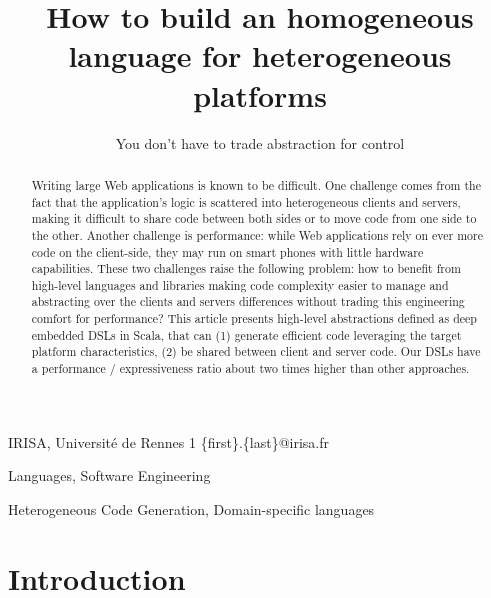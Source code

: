 \documentclass[preprint]{sigplanconf}
\begin{document}
\copyrightdata{[to be supplied]} 


\title{How to build an homogeneous language for heterogeneous platforms}
\subtitle{You don’t have to trade abstraction for control}

           {IRISA, Université de Rennes 1}
           {\{first\}.\{last\}@irisa.fr}

\maketitle

\begin{abstract}
Writing large Web applications is known to be difficult. One challenge comes from the fact that the application's
logic is scattered into heterogeneous clients and servers, making it difficult to share code between both sides or to
move code from one side to the other. Another challenge is performance: while Web applications rely on ever more
code on the client-side, they may run on smart phones with little hardware capabilities. These two challenges raise
the following problem: how to benefit from high-level languages and libraries making code complexity easier to manage
and abstracting over the clients and servers differences without trading this engineering comfort for performance?
This article presents high-level abstractions defined as deep embedded DSLs in Scala, that can (1) generate efficient
code leveraging the target platform characteristics, (2) be shared between client and server code. Our DSLs have a
performance / expressiveness ratio about two times higher than other approaches.
\end{abstract}


\terms Languages, Software Engineering

\keywords Heterogeneous Code Generation, Domain-specific languages

\section{Introduction}
\end{document}
